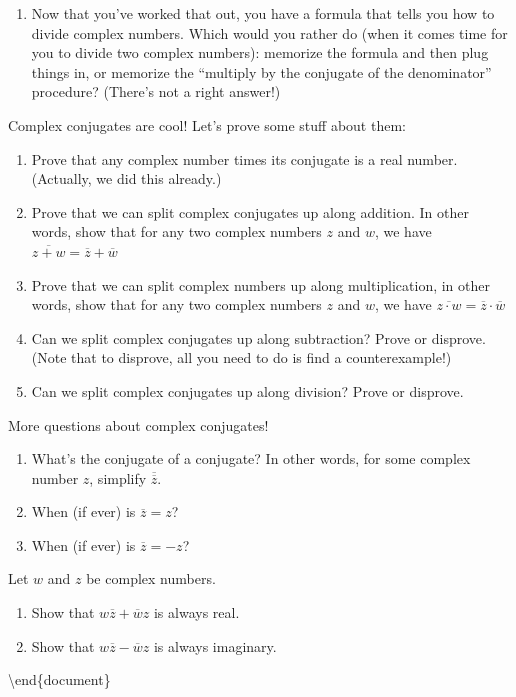 \documentclass[
]{article}
\begin{document}
\begin{problems}
\begin{enumerate}
\item Now that you've worked that out, you have a formula that tells you how to divide complex numbers. Which would you rather do (when it comes time for you to divide two complex numbers): memorize the formula and then plug things in, or memorize the ``multiply by the conjugate of the denominator'' procedure? (There's not a right answer!)
\end{enumerate}

\item Complex conjugates are cool! Let's prove some stuff about them:
\begin{enumerate}
\item Prove that any complex number times its conjugate is a real number. (Actually, we did this already.)
\item Prove that we can split complex conjugates up along addition. In other words, show that for any two complex numbers $z$ and $w$, we have $\overline{z+w} = \overline{z}+\overline{w}$
\item Prove that we can split complex numbers up along multiplication, in other words, show that for any two complex numbers $z$ and $w$, we have $\overline{z\cdot w} = \overline{z}\cdot\overline{w}$
\item Can we split complex conjugates up along subtraction? Prove or disprove. (Note that to disprove, all you need to do is find a counterexample!)
\item Can we split complex conjugates up along division? Prove or disprove.
\end{enumerate}
\item More questions about complex conjugates!
\begin{enumerate}
\item What's the conjugate of a conjugate? In other words, for some complex number $z$, simplify $\overline{\overline{z}}$.
\item When (if ever) is $\overline{z}=z$?
\item When (if ever) is $\overline{z} = -z$?
\end{enumerate}
\item Let $w$ and $z$ be complex numbers.
\begin{enumerate}
\item Show that $w\overline{z} + \overline{w}z$ is always real.
\item Show that $w\overline{z} - \overline{w}z$ is always imaginary.
\end{enumerate}
\end{problems}

\textbackslash end\{document\}
\end{document}
